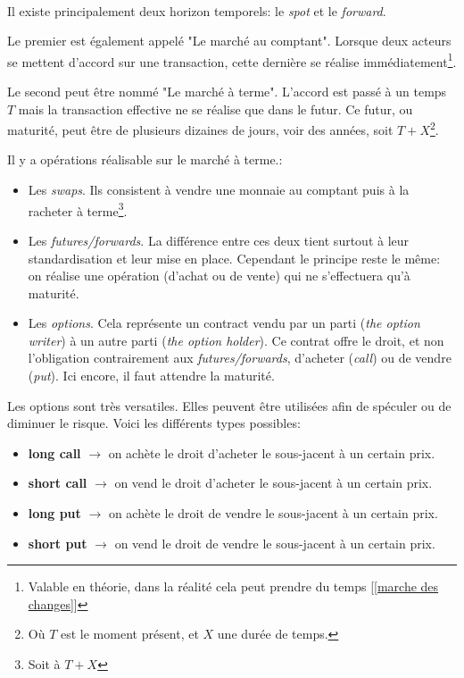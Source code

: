 \documentclass[a4paper, 11pt]{article}
\begin{document}
\paragraph{}
Il existe principalement deux horizon temporels: le \textit{spot} et le \textit{forward}.

Le premier est également appelé "Le marché au comptant". Lorsque deux acteurs se mettent d'accord sur une transaction, cette dernière se réalise immédiatement\footnote{Valable en théorie, dans la réalité cela peut prendre du temps [\ref{marche des changes}]}.

Le second peut être nommé "Le marché à terme". L'accord est passé à un temps $T$ mais la transaction effective ne se réalise que dans le futur. Ce futur, ou maturité, peut être de plusieurs dizaines de jours, voir des années, soit $T + X$\footnote{Où $T$ est le moment présent, et $X$ une durée de temps.}.

Il y a opérations réalisable sur le marché à terme.:
\begin{itemize}
\item Les \textit{swaps}. Ils consistent à vendre une monnaie au comptant puis à la racheter à terme\footnote{Soit à $T+X$}.
\item Les \textit{futures/forwards}. La différence entre ces deux tient surtout à leur standardisation et leur mise en place. Cependant le principe reste le même: on réalise une opération (d'achat ou de vente) qui ne s'effectuera qu'à maturité.
\item Les \textit{options}. Cela représente un contract vendu par un parti (\textit{the option writer}) à un autre parti (\textit{the option holder}). Ce contrat offre le droit, et non l'obligation contrairement aux \textit{futures/forwards}, d'acheter (\textit{call}) ou de vendre (\textit{put}). Ici encore, il faut attendre la maturité.
\end{itemize}

Les options sont très versatiles. Elles peuvent être utilisées afin de spéculer ou de diminuer le risque. Voici les différents types possibles:
\begin{itemize}
\item \textbf{long call} $\rightarrow$ on achète le droit d'acheter le sous-jacent à un certain prix.
\item \textbf{short call} $\rightarrow$ on vend le droit d'acheter le sous-jacent à un certain prix.
\item \textbf{long put} $\rightarrow$ on achète le droit de vendre le sous-jacent à un certain prix.
\item \textbf{short put} $\rightarrow$ on vend le droit de vendre le sous-jacent à un certain prix.
\end{itemize}
\end{document}
